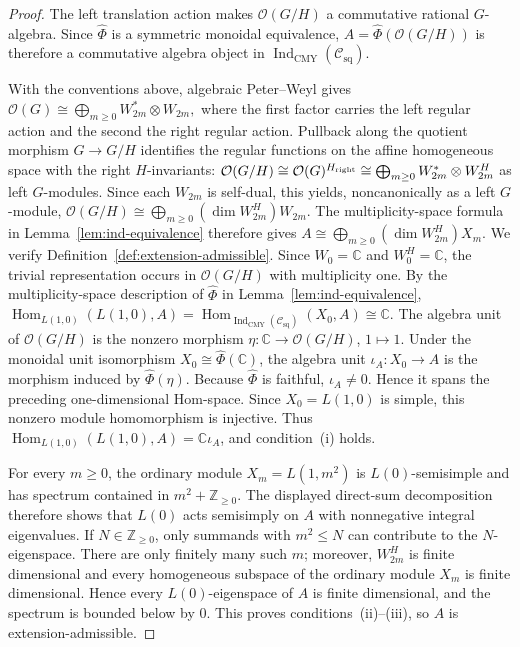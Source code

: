 \documentclass[12pt,leqno]{amsart}
\numberwithin{equation}{section} \newtheorem{thm}{Theorem}[section] \newtheorem{lem}[thm]{Lemma} \newtheorem{ex}[thm]{Example} \newtheorem{prop}[thm]{Proposition} \newtheorem{cor}[thm]{Corollary} \newtheorem{defi}[thm]{Definition} \newtheorem{rmk}[thm]{Remark} \newtheorem{notation}[thm]{Notation}
\newcommand{\Hom}{\operatorname{Hom}}
\newcommand{\OO}{\mathcal O}
\newcommand{\Csq}{\mathcal C_{\mathrm{sq}}}
\newcommand{\IndCMY}{\operatorname{Ind}_{\mathrm{CMY}}}
\def\Z{\mathbb{Z}} \def\N{\mathbb{N}} \def\A{\mathbb{A}} \def\C{\mathbb{C}} \def\R{\mathbb{R}} \def\Q{\mathbb{Q}} \def\F{\mathbb{F}}
\begin{document}
\begin{proof}
The left translation action makes $\OO(G/H)$ a commutative rational $G$-algebra. Since $\widehat\Phi$ is a symmetric monoidal equivalence, $A=\widehat\Phi(\OO(G/H))$ is therefore a commutative algebra object in $\IndCMY(\Csq)$.

With the conventions above, algebraic Peter--Weyl gives \(\OO(G)\cong\bigoplus_{m\ge0}W_{2m}^*\otimes W_{2m},\) where the first factor carries the left regular action and the second the right regular action. Pullback along the quotient morphism $G\to G/H$ identifies the regular functions on the affine homogeneous space with the right $H$-invariants: \(\OO(G/H)\cong\OO(G)^{H_{\rm right}}\cong\bigoplus_{m\ge0}W_{2m}^*\otimes W_{2m}^H\) as left $G$-modules. Since each $W_{2m}$ is self-dual, this yields, noncanonically as a left $G$-module, \(\OO(G/H)\cong\bigoplus_{m\ge0}(\dim W_{2m}^H) W_{2m}.\) The multiplicity-space formula in Lemma~\ref{lem:ind-equivalence} therefore gives \(A\cong\bigoplus_{m\ge0}(\dim W_{2m}^H) X_m.\) We verify Definition~\ref{def:extension-admissible}. Since $W_0=\C$ and $W_0^H=\C$, the trivial representation occurs in $\OO(G/H)$ with multiplicity one. By the multiplicity-space description of $\widehat\Phi$ in Lemma~\ref{lem:ind-equivalence}, \(\Hom_{L(1,0)}(L(1,0),A)=\Hom_{\IndCMY(\Csq)}(X_0,A)\cong\C.\) The algebra unit of $\OO(G/H)$ is the nonzero morphism $\eta:\C\to\OO(G/H)$, $1\mapsto1$. Under the monoidal unit isomorphism $X_0\cong\widehat\Phi(\C)$, the algebra unit $\iota_A:X_0\to A$ is the morphism induced by $\widehat\Phi(\eta)$. Because $\widehat\Phi$ is faithful, $\iota_A\ne0$. Hence it spans the preceding one-dimensional Hom-space. Since $X_0=L(1,0)$ is simple, this nonzero module homomorphism is injective. Thus \(\Hom_{L(1,0)}(L(1,0),A)=\C\iota_A\), and condition~\textnormal{(i)} holds.

For every $m\ge0$, the ordinary module $X_m=L(1,m^2)$ is $L(0)$-semisimple and has spectrum contained in $m^2+\Z_{\ge0}$. The displayed direct-sum decomposition therefore shows that $L(0)$ acts semisimply on $A$ with nonnegative integral eigenvalues. If $N\in\Z_{\ge0}$, only summands with $m^2\le N$ can contribute to the $N$-eigenspace. There are only finitely many such $m$; moreover, $W_{2m}^H$ is finite dimensional and every homogeneous subspace of the ordinary module $X_m$ is finite dimensional. Hence every $L(0)$-eigenspace of $A$ is finite dimensional, and the spectrum is bounded below by $0$. This proves conditions~\textnormal{(ii)}--\textnormal{(iii)}, so $A$ is extension-admissible.
\end{proof}
\end{document}
